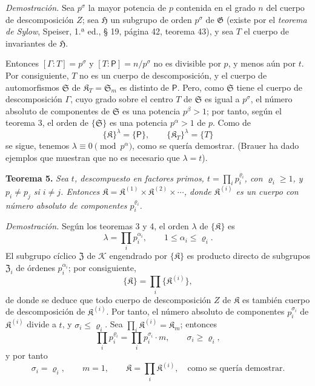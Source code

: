 \emph{Demostración.} Sea \(p^\sigma\) la mayor potencia de \(p\) contenida en el grado \(n\) del cuerpo de descomposición \(Z\); sea \(\mathfrak H\) un subgrupo de orden \(p^\sigma\) de \(\mathfrak G\) (existe por el \emph{teorema de Sylow}, Speiser, 1.ª ed., § 19, página 42, teorema 43), y sea \(T\) el cuerpo de invariantes de \(\mathfrak H\).

Entonces \([\Gamma:T]=p^\sigma\) y \([T:\mathsf P]=n/p^\sigma\) no es divisible por \(p\), y menos aún por \(t\). Por consiguiente, \(T\) no es un cuerpo de descomposición, y el cuerpo de automorfismos \(\mathfrak S\) de \(\mathfrak K_T=\mathfrak S_m\) es distinto de \(\mathsf P\). Pero, como \(\mathfrak S\) tiene el cuerpo de descomposición \(\Gamma\), cuyo grado sobre el centro \(T\) de \(\mathfrak S\) es igual a \(p^\sigma\), el número absoluto de componentes de \(\mathfrak S\) es una potencia \(p^\beta>1\); por tanto, según el teorema 3, el orden de \(\{\mathfrak S\}\) es una potencia \(p^\alpha>1\) de \(p\). Como de
\[
\{\mathfrak K\}^{\lambda}=\{\mathsf P\},
\qquad
\{\mathfrak K_T\}^{\lambda}=\{T\}
\]
se sigue, tenemos \(\lambda\equiv0\pmod {p^\alpha}\), como se quería demostrar. (Brauer ha dado ejemplos que muestran que no es necesario que \(\lambda=t\)).

\textbf{Teorema 5.} \emph{Sea \(t\), descompuesto en factores primos, \(t=\prod_i p_i^{\varrho_i}\), con \(\varrho_i\ge1\), y \(p_i\ne p_j\) si \(i\ne j\). Entonces \(\mathfrak K=\mathfrak K^{(1)}\times\mathfrak K^{(2)}\times\cdots\), donde \(\mathfrak K^{(i)}\) es un cuerpo con número absoluto de componentes \(p_i^{\varrho_i}\).}

\emph{Demostración.} Según los teoremas 3 y 4, el orden \(\lambda\) de \(\{\mathfrak K\}\) es
\[
\lambda=\prod_i p_i^{\alpha_i},\qquad 1\le\alpha_i\le\varrho_i.
\]
El subgrupo cíclico \(\mathfrak Z\) de \(\mathscr K\) engendrado por \(\{\mathfrak K\}\) es producto directo de subgrupos \(\mathfrak Z_i\) de órdenes \(p_i^{\alpha_i}\); por consiguiente,
\[
\{\mathfrak K\}=\prod_i\{\mathfrak K^{(i)}\},
\]
de donde se deduce que todo cuerpo de descomposición \(Z\) de \(\mathfrak K\) es también cuerpo de descomposición de \(\mathfrak K^{(i)}\). Por tanto, el número absoluto de componentes \(p_i^{\sigma_i}\) de \(\mathfrak K^{(i)}\) divide a \(t\), y \(\sigma_i\le\varrho_i\). Sea \(\prod_i \mathfrak K^{(i)}=\mathfrak K_m\); entonces
\[
\prod_i p_i^{\varrho_i}=\prod_i p_i^{\sigma_i}\cdot m,
\qquad
\sigma_i\ge\varrho_i,
\]
y por tanto
\[
\sigma_i=\varrho_i,\qquad m=1,\qquad
\mathfrak K=\prod_i \mathfrak K^{(i)},
\quad\text{como se quería demostrar.}
\]

